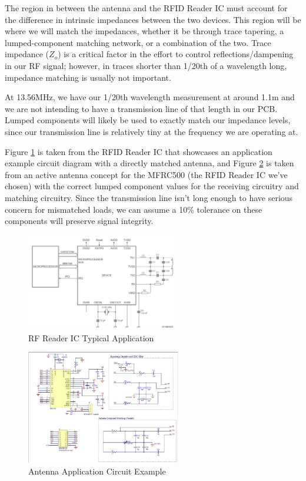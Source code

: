 \documentclass[12pt]{article}
\begin{document}
The region in between the antenna and the RFID Reader IC must account for the difference in intrinsic impedances between the two devices. This region will be where we will match the impedances, whether it be through trace tapering, a lumped-component matching network, or a combination of the two. Trace impedance ($Z_o$) is a critical factor in the effort to control reflections/dampening in our RF signal; however, in traces shorter than 1/20th of a wavelength long, impedance matching is usually not important. 

At 13.56MHz, we have our 1/20th wavelength measurement at around 1.1m and we are not intending to have a transmission line of that length in our PCB. Lumped components will likely be used to exactly match our impedance levels, since our transmission line is relatively tiny at the frequency we are operating at. 

Figure \ref{fig:reader} is taken from the RFID Reader IC that showcases an application example circuit diagram with a directly matched antenna, and Figure \ref{fig:antenna} is taken from an active antenna concept for the MFRC500 (the RFID Reader IC we've chosen) with the correct lumped component values for the receiving circuitry and matching circuitry. Since the transmission line isn't long enough to have serious concern for mismatched loads, we can assume a 10\% tolerance on these components will preserve signal integrity.

\begin{figure}[!h]
	\centering
	\includegraphics[width=0.6\textwidth]{image7.png}
	\caption{RF Reader IC Typical Application}
	\label{fig:reader}
\end{figure}

\begin{figure}[!h]
	\centering
	\includegraphics[width=0.6\textwidth]{image3.png}
	\caption{Antenna Application Circuit Example}
	\label{fig:antenna}
\end{figure}
\end{document}
